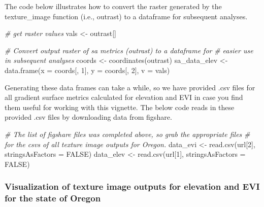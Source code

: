 \documentclass[
]{article}
\newenvironment{Shaded}{\begin{snugshade}}{\end{snugshade}}
\newcommand{\AttributeTok}[1]{\textcolor[rgb]{0.77,0.63,0.00}{#1}}
\newcommand{\CommentTok}[1]{\textcolor[rgb]{0.56,0.35,0.01}{\textit{#1}}}
\newcommand{\ConstantTok}[1]{\textcolor[rgb]{0.00,0.00,0.00}{#1}}
\newcommand{\DecValTok}[1]{\textcolor[rgb]{0.00,0.00,0.81}{#1}}
\newcommand{\FunctionTok}[1]{\textcolor[rgb]{0.00,0.00,0.00}{#1}}
\newcommand{\NormalTok}[1]{#1}
\newcommand{\OtherTok}[1]{\textcolor[rgb]{0.56,0.35,0.01}{#1}}
\begin{document}
The code below illustrates how to convert the raster generated by the
texture\_image function (i.e., outrast) to a dataframe for subsequent
analyses.

\begin{Shaded}
\begin{Highlighting}[]
\CommentTok{\# get raster values}
\NormalTok{vals }\OtherTok{\textless{}{-}}\NormalTok{ outrast[]}

\CommentTok{\# Convert output raster of sa metrics (outrast) to a dataframe for }
\CommentTok{\# easier use in subsequent analyses}
\NormalTok{coords }\OtherTok{\textless{}{-}} \FunctionTok{coordinates}\NormalTok{(outrast)}
\NormalTok{sa\_data\_elev }\OtherTok{\textless{}{-}} \FunctionTok{data.frame}\NormalTok{(}\AttributeTok{x =}\NormalTok{ coords[, }\DecValTok{1}\NormalTok{], }\AttributeTok{y =}\NormalTok{ coords[, }\DecValTok{2}\NormalTok{], }\AttributeTok{v =}\NormalTok{ vals)}
\end{Highlighting}
\end{Shaded}

Generating these data frames can take a while, so we have provided .csv
files for all gradient surface metrics calculated for elevation and EVI
in case you find them useful for working with this vignette. The below
code reads in these provided .csv files by downloading data from
figshare.

\begin{Shaded}
\begin{Highlighting}[]
\CommentTok{\# The list of figshare files was completed above, so grab the appropriate files}
\CommentTok{\# for the csv\textquotesingle{}s of all texture image outputs for Oregon.}
\NormalTok{data\_evi }\OtherTok{\textless{}{-}} \FunctionTok{read.csv}\NormalTok{(url[}\DecValTok{2}\NormalTok{], }\AttributeTok{stringsAsFactors =} \ConstantTok{FALSE}\NormalTok{)}
\NormalTok{data\_elev }\OtherTok{\textless{}{-}} \FunctionTok{read.csv}\NormalTok{(url[}\DecValTok{1}\NormalTok{], }\AttributeTok{stringsAsFactors =} \ConstantTok{FALSE}\NormalTok{)}
\end{Highlighting}
\end{Shaded}

\hypertarget{visualization-of-texture-image-outputs-for-elevation-and-evi-for-the-state-of-oregon}{%
\subsubsection{Visualization of texture image outputs for elevation and
EVI for the state of
Oregon}\label{visualization-of-texture-image-outputs-for-elevation-and-evi-for-the-state-of-oregon}}
\end{document}
